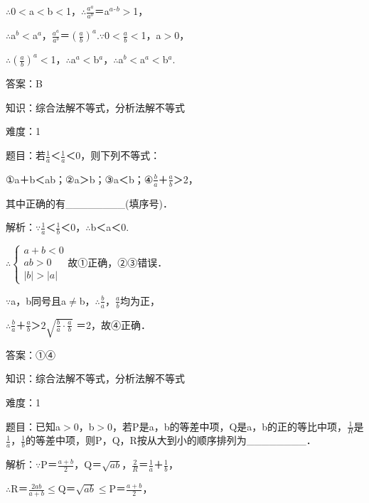 \documentclass{article} %
\begin{document}
$\mathrm{\therefore}$0$\mathrm{<}$a$\mathrm{<}$b$\mathrm{<}$1，$\mathrm{\therefore}$$\frac{a^a}{a^b}$＝a${}^{a}$${}^{\textrm{-}}$${}^{b}$$\mathrm{>}$1，

$\mathrm{\therefore}$a${}^{b}$$\mathrm{<}$a${}^{a}$，$\frac{a^a}{a^b}$＝$(\frac{a}{b})^a$.$\mathrm{\because}$0$\mathrm{<}$$\frac{a}{b}$$\mathrm{<}$1，a$\mathrm{>}$0，

$\mathrm{\therefore}$$(\frac{a}{b})^a$$\mathrm{<}$1，$\mathrm{\therefore}$a${}^{a}$$\mathrm{<}$b${}^{a}$，$\mathrm{\therefore}$a${}^{b}$$\mathrm{<}$a${}^{a}$$\mathrm{<}$b${}^{a}$.

 答案：B

 

 知识：综合法解不等式，分析法解不等式

 难度：1

 题目：若$\frac{1}{a}$＜$\frac{1}{a}$＜0，则下列不等式：

①a＋b＜ab；②{\textbar}a{\textbar}＞{\textbar}b{\textbar}；③a＜b；④$\frac{b}{a}$＋$\frac{a}{b}$＞2，

其中正确的有\_\_\_\_\_\_\_\_(填序号)．

 解析：$\mathrm{\because}$$\frac{1}{a}$＜$\frac{1}{b}$＜0，$\mathrm{\therefore}$b＜a＜0.

$\mathrm{\therefore}$$\left\{\begin{array}{r}
a+b<0\\
ab>0\\
|b|>|a|
\end{array} \right.$故①正确，②③错误．

$\mathrm{\because}$a，b同号且a$\mathrm{\neq}$b，$\mathrm{\therefore}$$\frac{b}{a}$，$\frac{a}{b}$均为正，

$\mathrm{\therefore}$$\frac{b}{a}$＋$\frac{a}{b}$＞$2\sqrt{\frac{b}{a}\cdot\frac{a}{b}}$ ＝2，故④正确．

 答案：①④



 知识：综合法解不等式，分析法解不等式

 难度：1

 题目：已知a$\mathrm{>}$0，b$\mathrm{>}$0，若P是a，b的等差中项，Q是a，b的正的等比中项，$\frac{1}{R}$是$\frac{1}{a}$，$\frac{1}{b}$的等差中项，则P，Q，R按从大到小的顺序排列为\_\_\_\_\_\_\_\_．

 解析：$\mathrm{\because}$P＝$\frac{a+b}{2}$，Q＝$\sqrt{ab}$，$\frac{2}{R}$＝$\frac{1}{a}$＋$\frac{1}{b}$，

$\mathrm{\therefore}$R＝$\frac{2ab}{a+b}$$\mathrm{\le}$Q＝$\sqrt{ab}$$\mathrm{\le}$P＝$\frac{a+b}{2}$，
\end{document}
